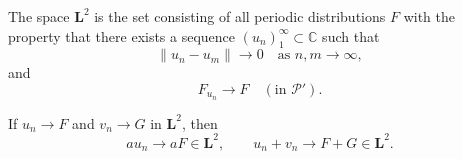The space $\mathbf{L}^2$ is the set consisting of all periodic distributions $F$ with the property that there exists a sequence $(u_n)_{1}^{\infty} \subset \mathbb{C}$ such that
$$
\|u_n - u_m\| \to 0 \quad \text{as } n, m \to \infty,
$$
and
$$
F_{u_n} \to F \quad (\text{in } \mathcal{P}').
$$

If $u_n \to F$ and $v_n \to G$ in $\mathbf{L}^2$, then
$$
a u_n \to aF \in \mathbf{L}^2, \qquad u_n + v_n \to F + G \in \mathbf{L}^2.
$$
